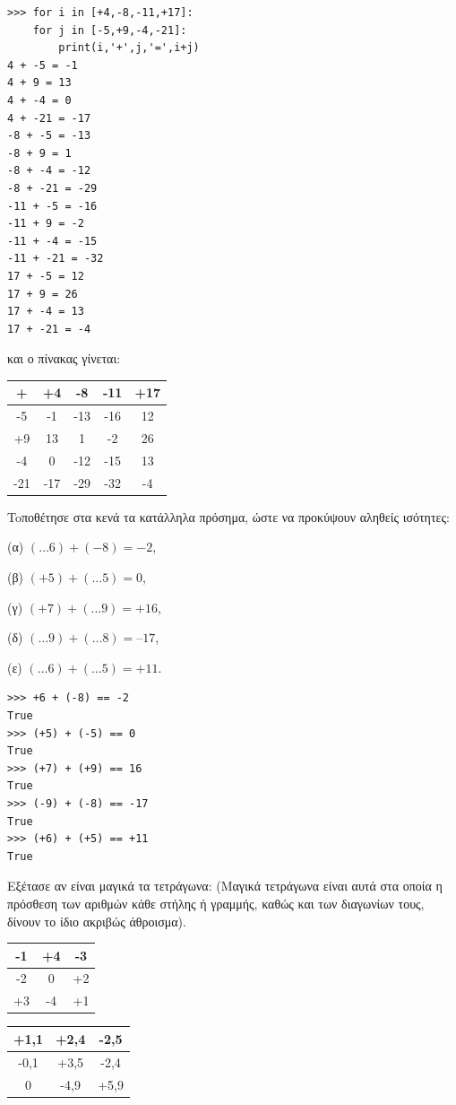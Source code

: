 \begin{lstlisting}
>>> for i in [+4,-8,-11,+17]:
    for j in [-5,+9,-4,-21]:
        print(i,'+',j,'=',i+j)
4 + -5 = -1
4 + 9 = 13
4 + -4 = 0
4 + -21 = -17
-8 + -5 = -13
-8 + 9 = 1
-8 + -4 = -12
-8 + -21 = -29
-11 + -5 = -16
-11 + 9 = -2
-11 + -4 = -15
-11 + -21 = -32
17 + -5 = 12
17 + 9 = 26
17 + -4 = 13
17 + -21 = -4        
\end{lstlisting}
και ο πίνακας γίνεται:
\begin{table}[h]
\begin{tabular}{|c|c|c|c|c|}
\hline
+ &  +4&-8 &-11&+17\\\hline
-5&  -1&-13&-16& 12\\\hline
+9&  13&1  & -2& 26\\\hline
-4&   0&-12&-15& 13\\\hline
-21&-17&-29&-32& -4\\\hline
\end{tabular}
\end{table}
\begin{exercise}
Toποθέτησε στα κενά τα κατάλληλα πρόσημα, ώστε να προκύψουν αληθείς ισότητες:

(α) $(\ldots 6) + (-8) = -2$, 

(β) $(+5) + (\ldots 5) = 0$, 

(γ) $(+7) + (\ldots 9) = +16$,

(δ) $(\ldots 9) + (\ldots 8) = –17$, 

(ε) $(\ldots 6) + (\ldots 5) = +11$.

\end{exercise}
\begin{lstlisting}
>>> +6 + (-8) == -2
True
>>> (+5) + (-5) == 0
True
>>> (+7) + (+9) == 16
True
>>> (-9) + (-8) == -17
True
>>> (+6) + (+5) == +11
True
\end{lstlisting}
\begin{exercise}
Εξέτασε αν είναι μαγικά τα τετράγωνα:
(Μαγικά τετράγωνα είναι αυτά στα οποία
η πρόσθεση των αριθμών κάθε στήλης ή
γραμμής, καθώς και των διαγωνίων
τους, δίνουν το ίδιο ακριβώς άθροισμα).
\begin{table}[h]
\begin{tabular}{|c|c|c|}
\hline
-1&+4&-3\\\hline
-2&0&+2\\\hline
+3&-4&+1\\\hline
\end{tabular}
\end{table}
\begin{table}[h]
\begin{tabular}{|c|c|c|}
\hline
+1,1&+2,4&-2,5\\\hline
-0,1&+3,5&-2,4\\\hline
0&-4,9&+5,9\\\hline
\end{tabular}
\end{table}
\end{exercise}

